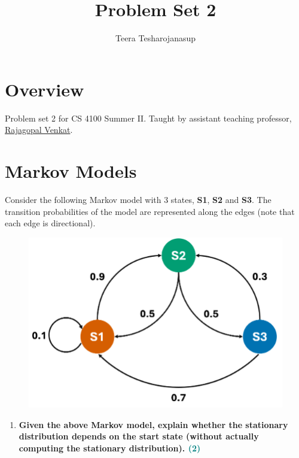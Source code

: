 \documentclass[a4paper]{article}
\begin{document}
\title{\textbf{\huge{Problem Set 2}}}

\author{\textbf\large{Teera Tesharojanasup}}


\date{}

\maketitle
\begin{sloppypar}

\section*{Overview}

Problem set 2 for CS 4100 Summer II. Taught by assistant teaching professor, \href{https://rajagopalvenkat.com/}{Rajagopal Venkat}. \cite{MISC:1}

\section{Markov Models}

\par Consider the following Markov model with 3 states, \textbf{S1}, \textbf{S2} and \textbf{S3}. The transition probabilities of the model are 
represented along the edges (note that each edge is directional).

\begin{figure}[H]
    \centering  
    \includegraphics[height=0.2\textheight]{markov_model.png}
    \label{fig:markov_model}
\end{figure}

\begin{enumerate}[start=1,label=Q\arabic*,left=0pt]
    \item \textbf{Given the above Markov model, explain whether the stationary distribution depends on the start state (without actually computing the stationary distribution). \hfill \textcolor{teal}{(2)}}
    

\end{enumerate}
\end{sloppypar}
\end{document}
